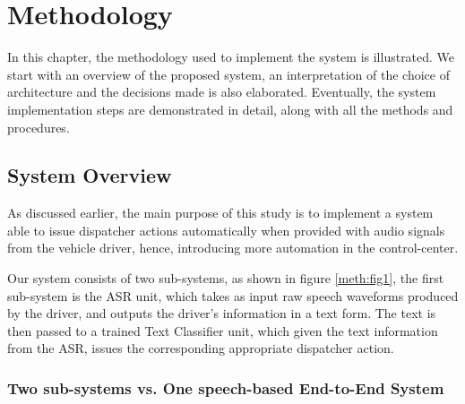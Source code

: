 \chapter{Methodology}
\label{chap:methodology}

 \hypersetup{
	colorlinks=false,
	linkcolor=black,
	filecolor=black,
	citecolor = blue,      
	urlcolor=cyan,
}

In this chapter, the methodology used to implement the system is illustrated. We start with an overview of the proposed system, an interpretation of the choice of architecture and the decisions made is also elaborated. Eventually, the system implementation steps are demonstrated in detail, along with all the methods and procedures.




\section{System Overview} 
\label{meth:s1}

As discussed earlier, the main purpose of this study is to implement a system able to issue dispatcher actions automatically when provided with audio signals from the vehicle driver, hence, introducing more automation in the control-center. 

Our system consists of two sub-systems, as shown in figure \ref{meth:fig1}, the first sub-system is the \acf{ASR} unit, which takes as input raw speech waveforms produced by the driver, and outputs the driver's information in a text form. The text is then passed to a trained Text Classifier unit, which given the text information from the \ac{ASR}, issues the corresponding appropriate dispatcher action.

\subsection{Two sub-systems vs. One speech-based End-to-End System}
\label{meth:s1_sub1}

